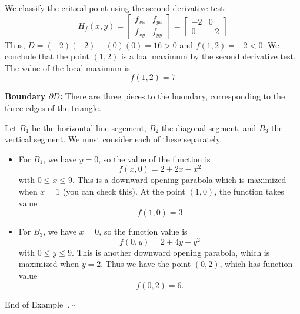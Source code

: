 \documentclass[10pt]{article}
\theoremstyle{definition}
\newtheorem{example}[theorem]{Example}
\renewenvironment{example}
{\begin{oldexample}}
  {\par\smallskip\hfill   End of Example~\theexample. $\square$    \par\end{oldexample}}
\newcommand{\fl}{\noindent\textbf} %
\newcommand{\1}[1]{\textbf{1}_{\left[#1\right]}} %
\begin{document}
\begin{example}
  We classify the critical point using the second derivative test:
  \begin{equation*}
    H_{f}(x,y) =
    \begin{bmatrix}
      f_{xx}&f_{yx}\\
      f_{xy}&f_{yy}
    \end{bmatrix}
    =
    \begin{bmatrix}
      -2&0\\
      0&-2
    \end{bmatrix}
  \end{equation*}
  Thus, $D= (-2)(-2)-(0)(0) = 16>0$ and $f(1,2) = -2<0$. We conclude that the
  point $(1,2)$ is a loal maximum by the second derivative test. The value of
  the local maximum is
  \begin{equation*}
    f(1,2) = 7
  \end{equation*}

  \fl{Boundary $\partial D$:} There are three pieces to the buondary,
  corresponding to the three edges of the triangle.

  Let $B_{1}$ be the horizontal line segement, $B_{2}$ the diagonal segment,
  and $B_{3}$ the vertical segment. We must consider each of these separately.

  \begin{itemize}
    \item For $B_{1}$, we have $y=0$, so the value of the function is
    \begin{equation*}
      f(x,0) = 2+2x-x^{2}
    \end{equation*}
    with $0 \leq x \leq 9$.
    This is a downward opening parabola which is maximized when $x=1$ (you can
    check this). At the point $(1,0)$, the function takes value
    \begin{equation*}
      f(1,0) = 3
    \end{equation*}
    \item For $B_{3}$, we have $x=0$, so the function value is
    \begin{equation*}
      f(0,y) =2+ 4y-y^{2}
    \end{equation*}
    with $0 \leq y \leq 9$. This is another downward opening parabola, which
    is maximized when $y=2$. Thus we have the point $(0,2)$, which has
    function value
    \begin{equation*}
      f(0,2) = 6.
    \end{equation*}
    

\end{itemize}
\end{example}
\end{document}
